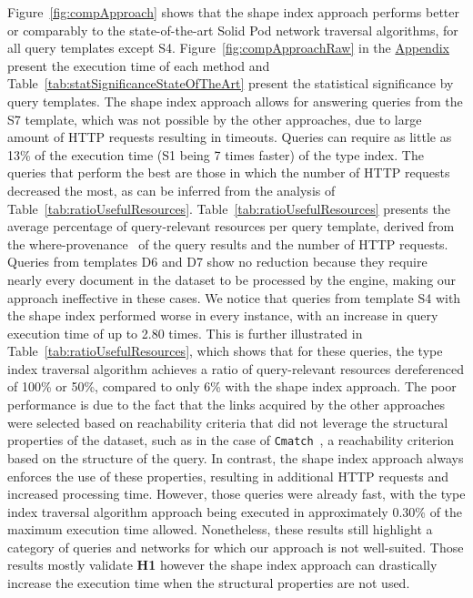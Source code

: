 Figure~\ref{fig:compApproach} shows that the shape index approach performs better or comparably to the state-of-the-art Solid Pod network traversal algorithms, for all query templates except S4.
Figure~\ref{fig:compApproachRaw} in the \hyperref[sec:appendix]{Appendix} present the execution time of each method and Table~\ref{tab:statSignificanceStateOfTheArt} present the statistical significance by query templates.
The shape index approach allows for answering queries from the S7 template, which was not possible by the other approaches, due to large amount of HTTP requests resulting in timeouts.
Queries can require as little as 13\% of the execution time (S1 being 7 times faster) of the type index.
The queries that perform the best are those in which the number of HTTP requests decreased the most, as can be inferred from the analysis of Table~\ref{tab:ratioUsefulResources}.
Table~\ref{tab:ratioUsefulResources} presents the average percentage of query-relevant resources per query template, derived from the where-provenance~\cite{buneman2001and} of the query results and the number of HTTP requests. 
Queries from templates D6 and D7 show no reduction because they require nearly every document in the dataset to be processed by the engine, making our approach ineffective in these cases.
We notice that queries from template S4 with the shape index performed worse in every instance, with an increase in query execution time of up to 2.80 times.
This is further illustrated in Table~\ref{tab:ratioUsefulResources}, which shows that for these queries, the type index traversal algorithm achieves a ratio of query-relevant resources dereferenced of 100\% or 50\%, compared to only 6\% with the shape index approach.
The poor performance is due to the fact that the links acquired by the other approaches were selected based on reachability criteria that did not leverage the structural properties of the dataset, such as in the case of \texttt{Cmatch}~\cite{hartig2016walking}, a reachability criterion based on the structure of the query.
In contrast, the shape index approach always enforces the use of these properties, resulting in additional HTTP requests and increased processing time.
However, those queries were already fast, with the type index traversal algorithm approach being executed in approximately 0.30\% of the maximum execution time allowed.
Nonetheless, these results still highlight a category of queries and networks for which our approach is not well-suited.
Those results mostly validate \textbf{H1} however the shape index approach can drastically increase the execution time when the structural properties are not used.

